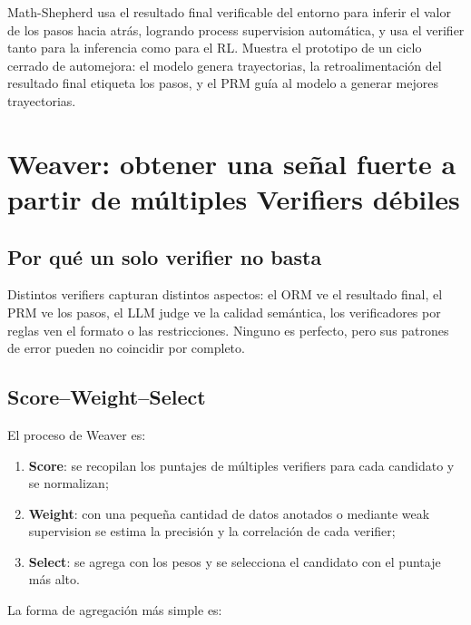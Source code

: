 \documentclass[a4paper]{article}
\begin{document}
Math-Shepherd usa el resultado final verificable del entorno para inferir el valor de los pasos hacia atrás, logrando process supervision automática, y usa el verifier tanto para la inferencia como para el RL. Muestra el prototipo de un ciclo cerrado de automejora: el modelo genera trayectorias, la retroalimentación del resultado final etiqueta los pasos, y el PRM guía al modelo a generar mejores trayectorias.
\section{Weaver: obtener una señal fuerte a partir de múltiples Verifiers débiles}

\subsection{Por qué un solo verifier no basta}

Distintos verifiers capturan distintos aspectos: el ORM ve el resultado final, el PRM ve los pasos, el LLM judge ve la calidad semántica, los verificadores por reglas ven el formato o las restricciones. Ninguno es perfecto, pero sus patrones de error pueden no coincidir por completo.


\subsection{Score--Weight--Select}

El proceso de Weaver es:

\begin{enumerate}
    \item \textbf{Score}: se recopilan los puntajes de múltiples verifiers para cada candidato y se normalizan;
    \item \textbf{Weight}: con una pequeña cantidad de datos anotados o mediante weak supervision se estima la precisión y la correlación de cada verifier;
    \item \textbf{Select}: se agrega con los pesos y se selecciona el candidato con el puntaje más alto.
\end{enumerate}


La forma de agregación más simple es:
\end{document}
